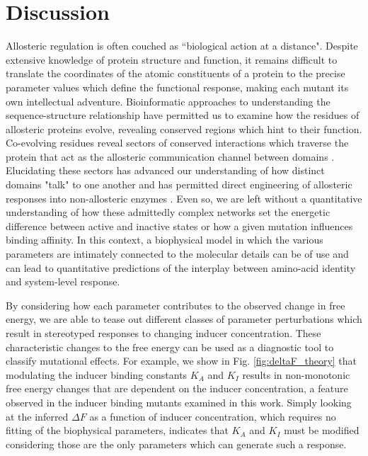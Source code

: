 \section{Discussion}
Allosteric regulation is often couched as ``biological action at a distance".
Despite extensive knowledge of protein structure and function, it remains
difficult to translate the coordinates of the atomic constituents of a
protein to the precise parameter values which define the functional response,
making each mutant its own intellectual adventure.
Bioinformatic approaches to understanding the sequence-structure relationship 
have permitted us to examine how the residues of allosteric proteins
evolve, revealing conserved regions which hint to their function.
Co-evolving residues reveal sectors of conserved
interactions which traverse the protein that act as the allosteric
communication channel between domains \cite{Suel2002, McLaughlin2012,
Reynolds2011}. Elucidating these sectors has advanced our understanding of
how distinct domains "talk" to one another and has permitted direct
engineering of allosteric responses into non-allosteric enzymes
\cite{Raman2014, Raman2016, Poelwijk2016}. Even so, we are left without a
quantitative understanding of how these admittedly complex networks set the
energetic difference between active and inactive states or how a given mutation
influences binding affinity. In this context, a biophysical model
in which the various parameters are intimately connected to the molecular
details can be of use and can lead to quantitative predictions of
the interplay between amino-acid identity and system-level response.

By considering how each parameter contributes to the observed change in free
energy, we are able to tease out different classes of parameter perturbations
which result in stereotyped responses to changing inducer concentration.
These characteristic changes to the free energy can be used as a diagnostic
tool to classify mutational effects. For example, we show in Fig.
\ref{fig:deltaF_theory} that modulating the inducer binding constants $K_A$
and $K_I$ results in non-monotonic free energy changes that are dependent on
the inducer concentration, a feature observed in the inducer binding mutants
examined in this work. Simply looking at the inferred $\Delta F$ as a function
of inducer concentration, which
requires no fitting of the biophysical parameters, indicates that $K_A$ and $K_I$ must be
modified considering those are the only parameters which can generate such a response.

